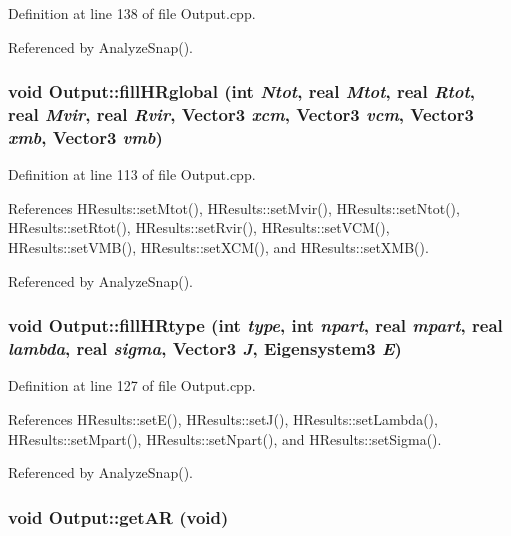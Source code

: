 Definition at line 138 of file Output.cpp.



Referenced by AnalyzeSnap().

\subsubsection[{fillHRglobal}]{\setlength{\rightskip}{0pt plus 5cm}void Output::fillHRglobal (int {\em Ntot}, \/  {\bf real} {\em Mtot}, \/  {\bf real} {\em Rtot}, \/  {\bf real} {\em Mvir}, \/  {\bf real} {\em Rvir}, \/  {\bf Vector3} {\em xcm}, \/  {\bf Vector3} {\em vcm}, \/  {\bf Vector3} {\em xmb}, \/  {\bf Vector3} {\em vmb})}\label{classOutput_a10e9ba492da5d302af6e295364b6da6c}


Definition at line 113 of file Output.cpp.



References HResults::setMtot(), HResults::setMvir(), HResults::setNtot(), HResults::setRtot(), HResults::setRvir(), HResults::setVCM(), HResults::setVMB(), HResults::setXCM(), and HResults::setXMB().



Referenced by AnalyzeSnap().

\subsubsection[{fillHRtype}]{\setlength{\rightskip}{0pt plus 5cm}void Output::fillHRtype (int {\em type}, \/  int {\em npart}, \/  {\bf real} {\em mpart}, \/  {\bf real} {\em lambda}, \/  {\bf real} {\em sigma}, \/  {\bf Vector3} {\em J}, \/  {\bf Eigensystem3} {\em E})}\label{classOutput_aee8f2718ff8e649941e3a7b9612e2a73}


Definition at line 127 of file Output.cpp.



References HResults::setE(), HResults::setJ(), HResults::setLambda(), HResults::setMpart(), HResults::setNpart(), and HResults::setSigma().



Referenced by AnalyzeSnap().

\subsubsection[{getAR}]{\setlength{\rightskip}{0pt plus 5cm}void Output::getAR (void)}\label{classOutput_a17fff27847f8925c27d3a394ab7fee52}


